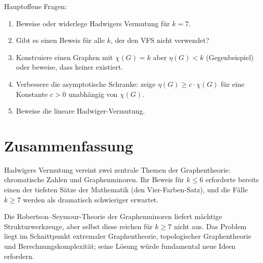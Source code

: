 \documentclass[12pt,a4paper]{amsart}
\theoremstyle{definition}
\theoremstyle{remark}
\begin{document}
\medskip

Hauptoffene Fragen:
\begin{enumerate}[label=(\arabic*)]
  \item Beweise oder widerlege Hadwigers Vermutung für $k = 7$.
  \item Gibt es einen Beweis für alle $k$, der den VFS nicht verwendet?
  \item Konstruiere einen Graphen mit $\chi(G) = k$ aber $\eta(G) < k$ (Gegenbeispiel)
        oder beweise, dass keiner existiert.
  \item Verbessere die asymptotische Schranke: zeige $\eta(G) \geq c \cdot \chi(G)$
        für eine Konstante $c > 0$ unabhängig von $\chi(G)$.
  \item Beweise die lineare Hadwiger-Vermutung.
\end{enumerate}

\section{Zusammenfassung}

Hadwigers Vermutung vereint zwei zentrale Themen der Graphentheorie: chromatische
Zahlen und Graphenminoren. Ihr Beweis für $k \leq 6$ erforderte bereits einen der
tiefsten Sätze der Mathematik (den Vier-Farben-Satz), und die Fälle $k \geq 7$
werden als dramatisch schwieriger erwartet.

Die Robertson--Seymour-Theorie der Graphenminoren liefert mächtige Strukturwerkzeuge,
aber selbst diese reichen für $k \geq 7$ nicht aus. Das Problem liegt im Schnittpunkt
extremaler Graphentheorie, topologischer Graphentheorie und Berechnungskomplexität;
seine Lösung würde fundamental neue Ideen erfordern.
\end{document}
